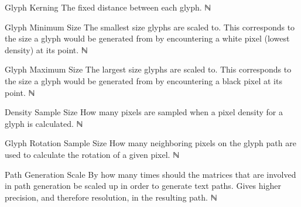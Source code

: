 \begin{itemize}
{\begin{itemize}
      \paritem
      {Glyph Kerning}
      {The fixed distance between each glyph.}
      {ℕ}
      {\GlyphKrnParSymbol}

      \paritem
      {Glyph Minimum Size}
      {The smallest size glyphs are scaled to.
        This corresponds to the size a glyph would be generated from by encountering a white pixel (lowest density) at its point.}
      {ℕ}
      {\GlyphSzMinParSymbol}

      \paritem
      {Glyph Maximum Size}
      {The largest size glyphs are scaled to.
        This corresponds to the size a glyph would be generated from by encountering a black pixel at its point.
      }
      {ℕ}
      {\GlyphSzMaxParSymbol}

      \paritem
      {Density Sample Size}
      {How many pixels are sampled when a pixel density for a glyph is calculated.}
      {ℕ}
      {\DnsSampleParSymbol}

      \paritem
      {Glyph Rotation Sample Size}
      {How many neighboring pixels on the glyph path are used to calculate the rotation of a given pixel.}
      {ℕ}
      {\GlyphRotParSymbol}

      \paritem
      {Path Generation Scale}
      {By how many times should the matrices that are involved in path generation be scaled up in order to generate text paths.
        Gives higher precision, and therefore resolution, in the resulting path.}
      {ℕ}
      {\PathGenSclParSymbol}

    \end{itemize}
  }
\end{itemize}
